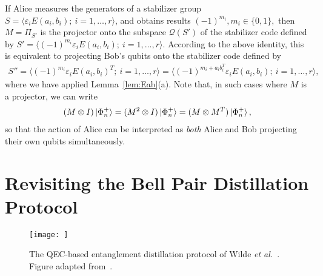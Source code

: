 \documentclass[journal,onecolumn]{IEEEtran}
\newcommand{\dket}[1]{\left\lvert #1 \right\rangle}
\newcommand{\etal}{\emph{et al.~}}
\newif\ifnotes
\newcommand{\narayanan}[1]{\ifnotes{{\color{blue} [Narayanan: #1]}}\fi}
\newcommand{\bane}[1]{\ifnotes{{\color{dkgreen} [Bane: #1]}}\fi}
\begin{document}
If Alice measures the generators of a stabilizer group $S = \langle \varepsilon_i E(a_i,b_i); \ i = 1,\ldots,r \rangle$, and obtains results $(-1)^{m_i}, m_i \in \{0,1\},$ then $M = \Pi_{S'}$ is the projector onto the subspace $\mathcal{Q}(S')$ of the stabilizer code defined by $S' = \langle (-1)^{m_i} \varepsilon_i E(a_i,b_i); \ i = 1,\ldots,r \rangle$. 
According to the above identity, this is equivalent to projecting Bob's qubits onto the stabilizer code defined by 
\begin{align}
S'' = \langle (-1)^{m_i} \varepsilon_i E(a_i,b_i)^T; \ i = 1,\ldots,r \rangle = \langle (-1)^{m_i + a_i b_i^T} \varepsilon_i E(a_i,b_i); \ i = 1,\ldots,r \rangle,
\end{align}
where we have applied Lemma~\ref{lem:Eab}(a).
Note that, in such cases where $M$ is a projector, we can write
\begin{align}
\label{eq:projector_bell_pair}
(M \otimes I)\ket{\Phi^{+}_n} = (M^2 \otimes I)\ket{\Phi^{+}_n} = (M \otimes M^T)\ket{\Phi^{+}_n},
\end{align}
so that the action of Alice can be interpreted as \emph{both} Alice and Bob projecting their own qubits simultaneously.


\section{Revisiting the Bell Pair Distillation Protocol}
\label{sec:bell_distillation}



\begin{figure}
 \centering
\texttt{[image: ]}
  \caption{The QEC-based entanglement distillation protocol of Wilde \etal \cite{Wilde-isit10}. Figure adapted from~\cite{Wilde-isit10}. 
   }
   \label{fig:bell-pair-entanglement}
\end{figure}
\end{document}
